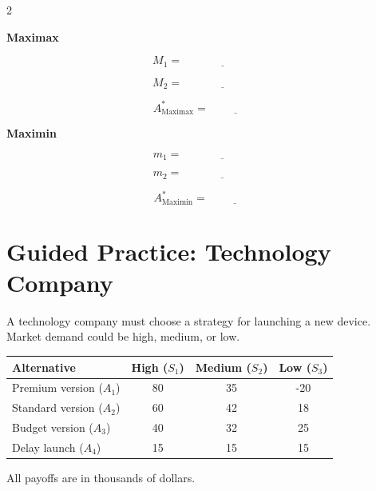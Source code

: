 	\begin{multicols}{2}
		
		\textbf{Maximax}
		
		\[
		M_1=\underline{\hspace{3cm}}
		\]
		
		\[
		M_2=\underline{\hspace{3cm}}
		\]
		
		\[
		A^*_{\mathrm{Maximax}}
		=\underline{\hspace{2cm}}
		\]
		
		\columnbreak
		
		\textbf{Maximin}
		
		\[
		m_1=\underline{\hspace{3cm}}
		\]
		
		\[
		m_2=\underline{\hspace{3cm}}
		\]
		
		\[
		A^*_{\mathrm{Maximin}}
		=\underline{\hspace{2cm}}
		\]
		
	\end{multicols}
	
	
	\section{Guided Practice: Technology Company}
	
	A technology company must choose a strategy for launching a new device.
	Market demand could be high, medium, or low.
	
	\begin{center}
		\renewcommand{\arraystretch}{1.3}
		\begin{tabular}{lccc}
			\toprule
			Alternative & High ($S_1$) & Medium ($S_2$) & Low ($S_3$) \\
			\midrule
			Premium version ($A_1$) & 80 & 35 & -20 \\
			Standard version ($A_2$) & 60 & 42 & 18 \\
			Budget version ($A_3$) & 40 & 32 & 25 \\
			Delay launch ($A_4$) & 15 & 15 & 15 \\
			\bottomrule
		\end{tabular}
	\end{center}
	
	All payoffs are in thousands of dollars.
	
